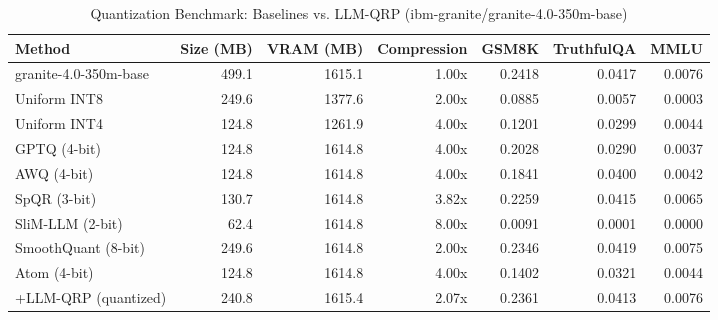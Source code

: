 \begin{table}[htbp]
  \centering
  \small
  \caption{Quantization Benchmark: Baselines vs. LLM-QRP (ibm-granite/granite-4.0-350m-base)}
  \label{tab:benchmark}
  \begin{tabular}{lrrrrrr}
    \toprule
    \textbf{Method} & \textbf{Size (MB)} & \textbf{VRAM (MB)} & \textbf{Compression} & \textbf{GSM8K} & \textbf{TruthfulQA} & \textbf{MMLU} \\
    \midrule
    granite-4.0-350m-base & 499.1 & 1615.1 & 1.00x & 0.2418 & 0.0417 & 0.0076 \\
    Uniform INT8 & 249.6 & 1377.6 & 2.00x & 0.0885 & 0.0057 & 0.0003 \\
    Uniform INT4 & 124.8 & 1261.9 & 4.00x & 0.1201 & 0.0299 & 0.0044 \\
    GPTQ (4-bit) & 124.8 & 1614.8 & 4.00x & 0.2028 & 0.0290 & 0.0037 \\
    AWQ (4-bit) & 124.8 & 1614.8 & 4.00x & 0.1841 & 0.0400 & 0.0042 \\
    SpQR (3-bit) & 130.7 & 1614.8 & 3.82x & 0.2259 & 0.0415 & 0.0065 \\
    SliM-LLM (2-bit) & 62.4 & 1614.8 & 8.00x & 0.0091 & 0.0001 & 0.0000 \\
    SmoothQuant (8-bit) & 249.6 & 1614.8 & 2.00x & 0.2346 & 0.0419 & 0.0075 \\
    Atom (4-bit) & 124.8 & 1614.8 & 4.00x & 0.1402 & 0.0321 & 0.0044 \\
    \midrule
    +LLM-QRP (quantized) & 240.8 & 1615.4 & 2.07x & 0.2361 & 0.0413 & 0.0076 \\
    \bottomrule
  \end{tabular}
\end{table}

